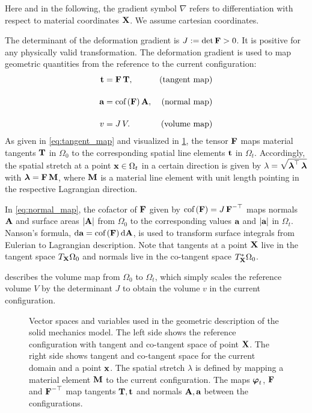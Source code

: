 Here and in the following, the gradient symbol $∇$ refers to differentiation with respect to material coordinates $\textbf{X}$. 
We assume cartesian coordinates.

The determinant of the deformation gradient is $J:= \hbox{det} \, \textbf{F}>0$. It is positive for any physically valid transformation.
The deformation gradient is used to map geometric quantities from the reference to the current configuration:
\begin{subequations}\label{eq:geometry_maps}
  \begin{align}
    \textbf{t} &= \textbf{F}\,\textbf{T}, & \text{(tangent map)} \label{eq:tangent_map}\\[4mm]
    \textbf{a} &= \hbox{cof} \,(\textbf{F})\,\textbf{A}, & \text{(normal map)} \label{eq:normal_map}\\[4mm]
    v &= J\,V. & \text{(volume map)}\label{eq:volume_map}
  \end{align}
\end{subequations}
%
As given in \cref{eq:tangent_map} and visualized in \cref{fig:geometric_quantities}, the tensor $\textbf{F}$ maps material tangents $\textbf{T}$ in $\Omega_0$ to the corresponding spatial line elements $\textbf{t}$ in $\Omega_t$. 
Accordingly, the spatial stretch at a point $\textbf{x} \in \Omega_t$ in a certain direction is given by $\lambda=\sqrt{\boldsymbol{\lambda}^\top\,\boldsymbol{\lambda}}$ with $\boldsymbol{\lambda} = \textbf{F}\,\textbf{M}$, where $\textbf{M}$ is a material line element with unit length pointing in the respective Lagrangian direction.

In \cref{eq:normal_map}, the cofactor of $\textbf{F}$ given by $\hbox{cof} \,(\textbf{F}) = J\,\textbf{F}^{-\top}$ maps normals $\textbf{A}$ and surface areas $|\textbf{A}|$ from $\Omega_0$ to the corresponding values $\textbf{a}$ and $|\textbf{a}|$ in $\Omega_t$. Nanson's formula, $\d \bfa = \cof(\bfF)\,\d\bfA$, is used to transform surface integrals from Eulerian to Lagrangian description.
Note that tangents at a point $\textbf{X}$ live in the tangent space $T_{\textbf{X}}\Omega_0$ and normals live in the co-tangent space $T^\ast_{\textbf{X}}\Omega_0$.

 describes the volume map from $\Omega_0$ to $\Omega_t$, which simply scales the reference volume $V$ by the determinant $J$ to obtain the volume $v$ in the current configuration.

\begin{figure}
  \centering%
  \def\svgwidth{0.7\textwidth}
  \caption{Vector spaces and variables used in the geometric description of the solid mechanics model. The left side shows the reference configuration with tangent and co-tangent space of point $\textbf{X}$. The right side shows tangent and co-tangent space for the current domain and a point $\textbf{x}$. The spatial stretch $\lambda$ is defined by mapping a material element $\textbf{M}$ to the current configuration. The maps $\boldsymbol{\varphi}_t$, $\textbf{F}$ and $\textbf{F}^{-\top}$ map tangents $\textbf{T},\textbf{t}$ and normals $\textbf{A},\textbf{a}$ between the configurations.}%
  \label{fig:geometric_quantities}%
\end{figure}

